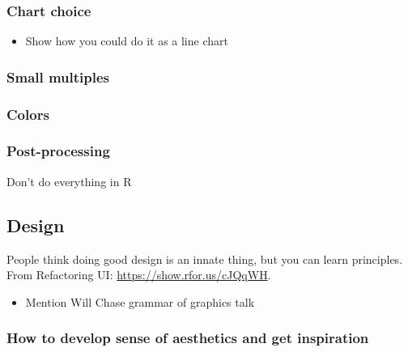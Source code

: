 \documentclass[
]{book}
\providecommand{\tightlist}{%
  \setlength{\itemsep}{0pt}\setlength{\parskip}{0pt}}
\begin{document}
\hypertarget{chart-choice}{%
\subsubsection*{Chart choice}\label{chart-choice}}

\begin{itemize}
\tightlist
\item
  Show how you could do it as a line chart
\end{itemize}

\hypertarget{small-multiples}{%
\subsubsection*{Small multiples}\label{small-multiples}}

\hypertarget{colors}{%
\subsubsection*{Colors}\label{colors}}

\hypertarget{post-processing}{%
\subsubsection*{Post-processing}\label{post-processing}}

Don't do everything in R

\hypertarget{design}{%
\subsection*{Design}\label{design}}

People think doing good design is an innate thing, but you can learn principles. From Refactoring UI: \url{https://show.rfor.us/cJQqWH}.

\begin{itemize}
\tightlist
\item
  Mention Will Chase grammar of graphics talk
\end{itemize}

\hypertarget{how-to-develop-sense-of-aesthetics-and-get-inspiration}{%
\subsubsection*{How to develop sense of aesthetics and get inspiration}\label{how-to-develop-sense-of-aesthetics-and-get-inspiration}}
\end{document}
